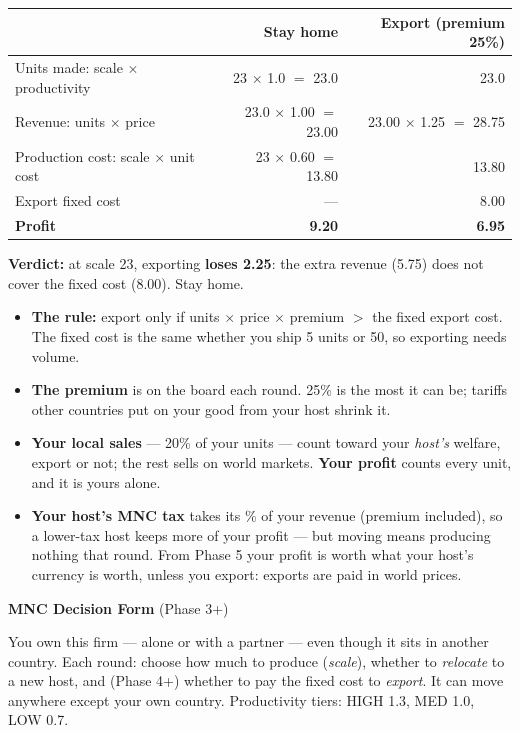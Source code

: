 \documentclass[11pt]{article}
\begin{document}
\vspace{6pt}
\begin{center}
\renewcommand{\arraystretch}{1.25}
\begin{tabular}{lrr}
\toprule
 & \textbf{Stay home} & \textbf{Export} (premium 25\%) \\
\midrule
Units made: scale $\times$ productivity & 23 $\times$ 1.0 $=$ 23.0 & 23.0 \\
Revenue: units $\times$ price & 23.0 $\times$ 1.00 $=$ 23.00
  & 23.00 $\times$ 1.25 $=$ 28.75 \\
Production cost: scale $\times$ unit cost & 23 $\times$ 0.60 $=$ 13.80 & 13.80 \\
Export fixed cost & --- & 8.00 \\
\midrule
\textbf{Profit} & \textbf{9.20} & \textbf{6.95} \\
\bottomrule
\end{tabular}
\end{center}

\textbf{Verdict:} at scale 23, exporting \textbf{loses 2.25}: the extra revenue (5.75) does not cover the fixed cost (8.00). Stay home.

\vspace{4pt}
\begin{itemize}[nosep,leftmargin=1.2em]
  \item \textbf{The rule:} export only if units $\times$ price $\times$ premium
    $>$ the fixed export cost. The fixed cost is the same whether you ship 5 units
    or 50, so exporting needs volume.
  \item \textbf{The premium} is on the board each round. 25\% is the most it
    can be; tariffs other countries put on your good from your host shrink it.
  \item \textbf{Your local sales} --- 20\% of your units --- count toward your
    \emph{host's} welfare, export or not; the rest sells on world markets.
    \textbf{Your profit} counts every unit, and it is yours alone.
  \item \textbf{Your host's MNC tax} takes its \% of your revenue (premium
    included), so a lower-tax host keeps more of your profit --- but moving
    means producing nothing that round. From Phase 5 your profit is worth what
    your host's currency is worth, unless you export: exports are paid in world
    prices.
\end{itemize}

\newpage
{\large\bfseries MNC Decision Form} \hfill (Phase 3+)\par
You own this firm --- alone or with a partner --- even though it sits in another country. Each round: choose how much to produce (\emph{scale}), whether to \emph{relocate} to a new host, and (Phase 4+) whether to pay the fixed cost to \emph{export}. It can move anywhere except your own country. Productivity tiers: HIGH 1.3, MED 1.0, LOW 0.7.
\vspace{6pt}
\end{document}

